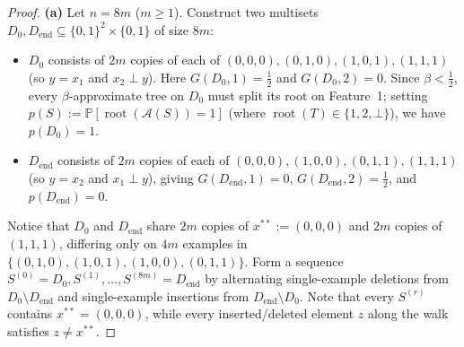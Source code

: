 \documentclass[11pt]{article}
\theoremstyle{definition}
\newcommand{\Prob}{\mathbb{P}}
\newcommand{\calA}{\mathcal{A}}
\begin{document}
\begin{proof}
\textbf{(a)} Let $n = 8m$ ($m \ge 1$). Construct two multisets $D_0, D_{\mathrm{end}} \subseteq \{0,1\}^2 \times \{0,1\}$ of size $8m$:
\begin{itemize}[leftmargin=1.5em,itemsep=1pt]
    \item $D_0$ consists of $2m$ copies of each of $(0,0,0), (0,1,0), (1,0,1), (1,1,1)$ (so $y = x_1$ and $x_2 \perp y$). Here $G(D_0, 1) = \frac{1}{2}$ and $G(D_0, 2) = 0$. Since $\beta < \frac{1}{2}$, every $\beta$-approximate tree on $D_0$ must split its root on Feature~1; setting $p(S) := \Prob[\operatorname{root}(\calA(S)) = 1]$ (where $\operatorname{root}(T) \in \{1, 2, \bot\}$), we have $p(D_0) = 1$.
    \item $D_{\mathrm{end}}$ consists of $2m$ copies of each of $(0,0,0), (1,0,0), (0,1,1), (1,1,1)$ (so $y = x_2$ and $x_1 \perp y$), giving $G(D_{\mathrm{end}}, 1) = 0$, $G(D_{\mathrm{end}}, 2) = \frac{1}{2}$, and $p(D_{\mathrm{end}}) = 0$.
\end{itemize}
Notice that $D_0$ and $D_{\mathrm{end}}$ share $2m$ copies of $x^{**} := (0,0,0)$ and $2m$ copies of $(1,1,1)$, differing only on $4m$ examples in $\{(0,1,0), (1,0,1), (1,0,0), (0,1,1)\}$. Form a sequence $S^{(0)} = D_0, S^{(1)}, \dots, S^{(8m)} = D_{\mathrm{end}}$ by alternating single-example deletions from $D_0 \setminus D_{\mathrm{end}}$ and single-example insertions from $D_{\mathrm{end}} \setminus D_0$. Note that every $S^{(r)}$ contains $x^{**} = (0,0,0)$, while every inserted/deleted element $z$ along the walk satisfies $z \ne x^{**}$.


\end{proof}
\end{document}
